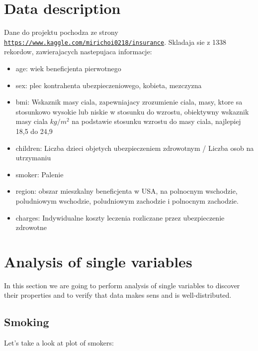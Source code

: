 \documentclass{article}
\begin{document}
\section{Data description}
Dane do projektu pochodza ze strony \href{url}{\texttt{https://www.kaggle.com/mirichoi0218/insurance}}. Skladaja sie z 1338 rekordow, zawierajacych nastepujaca informacje:
\begin{itemize}
  \item age: wiek beneficjenta pierwotnego
  \item sex: plec kontrahenta ubezpieczeniowego, kobieta, mezczyzna
  \item bmi: Wskaznik masy ciala, zapewniajacy zrozumienie ciala, masy, ktore sa stosunkowo wysokie lub niskie w stosunku do wzrostu,
  obiektywny wskaznik masy ciala \(kg/m^2\) na podstawie stosunku wzrostu do masy ciala, najlepiej 18,5 do 24,9
  \item children: Liczba dzieci objetych ubezpieczeniem zdrowotnym / Liczba osob na utrzymaniu
  \item smoker: Palenie
  \item region: obszar mieszkalny beneficjenta w USA, na polnocnym wschodzie, poludniowym wschodzie, poludniowym zachodzie i polnocnym zachodzie.
  \item charges: Indywidualne koszty leczenia rozliczane przez ubezpieczenie zdrowotne
\end{itemize}


\section{Analysis of single variables}
In this section we are going to perform analysis of single variables to discover their properties and to verify that data makes sens and is well-distributed.
\subsection{Smoking}
Let's take a look at plot of smokers:
\end{document}
